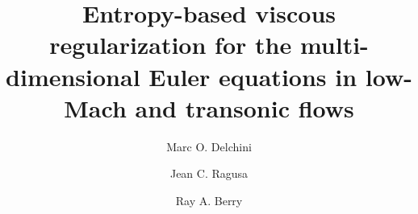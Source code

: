 \documentclass[preprint,10pt]{elsarticle}
\begin{document}
\begin{frontmatter}


\title{Entropy-based viscous regularization for the multi-dimensional Euler equations in low-Mach and transonic flows}
\author{Marc O. Delchini}

\author{Jean C. Ragusa}

\author{Ray A. Berry}

\address[label1]{Department of Nuclear Engineering, Texas A\&M University, College Station, TX 77843, USA }

\address[label2]{Idaho National Laboratory, Idaho Falls, ID 83415, USA }


\end{frontmatter}
\end{document}
